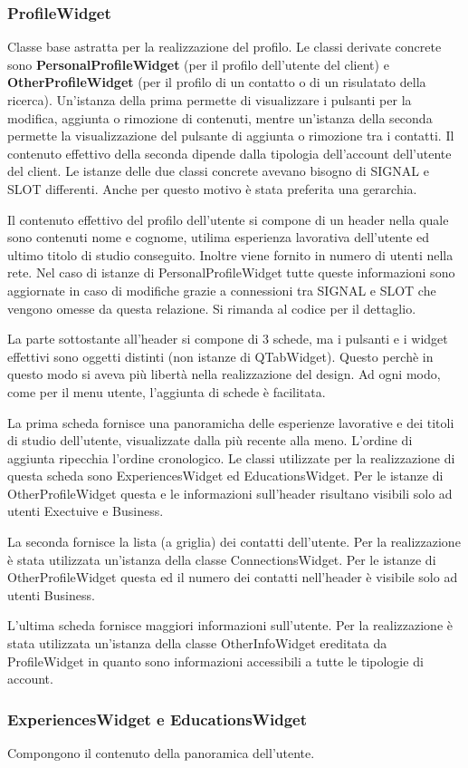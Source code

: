 \documentclass[a4paper]{article}
\begin{document}
\subsubsection*{ProfileWidget}
Classe base astratta per la realizzazione del profilo. Le classi derivate concrete sono \textbf{PersonalProfileWidget} (per il profilo dell'utente del client) e \textbf{OtherProfileWidget} (per il profilo di un contatto o di un risulatato della ricerca). Un'istanza della prima permette di visualizzare i pulsanti per la modifica, aggiunta o rimozione di contenuti, mentre un'istanza della seconda permette la visualizzazione del pulsante di aggiunta o rimozione tra i contatti. Il contenuto effettivo della seconda dipende dalla tipologia dell'account dell'utente del client. Le istanze delle due classi concrete avevano bisogno di SIGNAL e SLOT differenti. Anche per questo motivo è stata preferita una gerarchia.

Il contenuto effettivo del profilo dell'utente si compone di un header nella quale sono contenuti nome e cognome, utilima esperienza lavorativa dell'utente ed ultimo titolo di studio conseguito. Inoltre viene fornito in numero di utenti nella rete. Nel caso di istanze di PersonalProfileWidget tutte queste informazioni sono aggiornate in caso di modifiche grazie a connessioni tra SIGNAL e SLOT che vengono omesse da questa relazione. Si rimanda al codice per il dettaglio.

La parte sottostante all'header si compone di 3 schede, ma i pulsanti e i widget effettivi sono oggetti distinti (non istanze di QTabWidget). Questo perchè in questo modo si aveva più libertà nella realizzazione del design. Ad ogni modo, come per il menu utente, l'aggiunta di schede è facilitata. 

La prima scheda fornisce una panoramicha delle esperienze lavorative e dei titoli di studio dell'utente, visualizzate dalla più recente alla meno. L'ordine di aggiunta ripecchia l'ordine cronologico. Le classi utilizzate per la realizzazione di questa scheda sono ExperiencesWidget ed EducationsWidget. Per le istanze di OtherProfileWidget questa e le informazioni sull'header risultano visibili solo ad utenti Exectuive e Business.

La seconda fornisce la lista (a griglia) dei contatti dell'utente. Per la realizzazione è stata utilizzata un'istanza della classe ConnectionsWidget. Per le istanze di OtherProfileWidget questa ed il numero dei contatti nell'header è visibile solo ad utenti Business.

L'ultima scheda fornisce maggiori informazioni sull'utente. Per la realizzazione è stata utilizzata un'istanza della classe OtherInfoWidget ereditata da ProfileWidget in quanto sono informazioni accessibili a tutte le tipologie di account.

\subsubsection*{ExperiencesWidget e EducationsWidget}
Compongono il contenuto della panoramica dell'utente.
\end{document}
